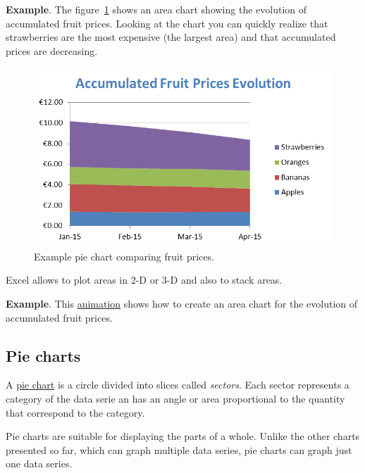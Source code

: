 \textbf{Example}. The figure~\ref{img-example_chart_area} shows an area chart showing the evolution of accumulated fruit prices.
Looking at the chart you can quickly realize that strawberries are the most expensive (the largest area) and that
accumulated prices are decreasing. 

\begin{figure}[htbp]
\begin{center}
\includegraphics[scale=0.7]{../img/example_chart_area.png}
\end{center}
\caption{Example pie chart comparing fruit prices.}
\label{img-example_chart_area}
\end{figure}

Excel allows to plot areas in 2-D or 3-D and also to stack areas.

\textbf{Example}. This \href{http://aprendeconalf.es/office/excel/manual/img/example_chart_area.gif}{animation} shows how to create an area chart for the evolution of accumulated fruit prices.

\subsection{Pie charts}\hypertarget{pie-charts}{}\label{pie-charts}

A \href{https://en.wikipedia.org/wiki/Pie\_chart}{pie chart} is a circle divided into slices called \emph{sectors}. Each sector represents a category of the data serie an has an angle or area proportional to the quantity that correspond to the category.

Pie charts are suitable for displaying the parts of a whole. Unlike the other charts presented so far, which can graph multiple data series, pie charts can graph just one data series.

